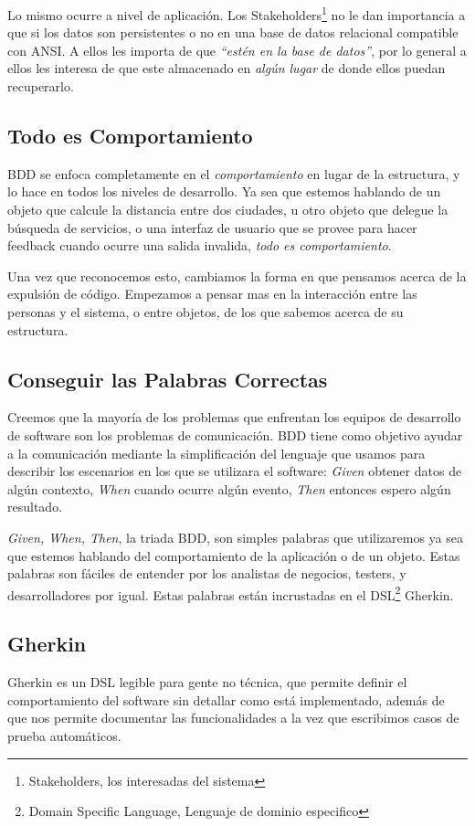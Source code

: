 Lo mismo ocurre a nivel de aplicación. Los Stakeholders\footnote{Stakeholders,
los interesadas del sistema} no le dan importancia a que si los datos son
persistentes o no en una base de datos relacional compatible con ANSI. A ellos
les importa de que {\it ``estén en la base de datos''}, por lo general a ellos
les interesa de que este almacenado en {\it algún lugar} de donde ellos puedan
recuperarlo.

\subsection{Todo es Comportamiento}
BDD se enfoca completamente en el {\it comportamiento} en lugar de la estructura,
y lo hace en todos los niveles de desarrollo. Ya sea que estemos hablando de un
objeto que calcule la distancia entre dos ciudades, u otro objeto que delegue la
búsqueda de servicios, o una interfaz de usuario que se provee para hacer feedback
cuando ocurre una salida invalida, {\it todo es comportamiento}.

Una vez que reconocemos esto, cambiamos la forma en que pensamos acerca de la
expulsión de código. Empezamos a pensar mas en la interacción entre las personas
y el sistema, o entre objetos, de los que sabemos acerca de su estructura.

\subsection{Conseguir las Palabras Correctas}
Creemos que la mayoría de los problemas que enfrentan los equipos de desarrollo
de software son los problemas de comunicación. BDD tiene como objetivo ayudar a la
comunicación mediante la simplificación del lenguaje que usamos para describir los
escenarios en los que se utilizara el software: {\it Given} obtener datos de algún
contexto, {\it When} cuando ocurre algún evento, {\it Then} entonces espero algún
resultado.

{\it Given, When, Then}, la triada BDD, son simples palabras que utilizaremos ya
sea que estemos hablando del comportamiento de la aplicación o de un objeto. Estas
palabras son fáciles de entender por los analistas de negocios, testers, y
desarrolladores por igual. Estas palabras están incrustadas en el DSL\footnote{
Domain Specific Language, Lenguaje de dominio especifico} Gherkin.

\subsection{Gherkin}
Gherkin es un DSL legible para gente no técnica, que permite definir el
comportamiento del software sin detallar como está implementado, además de que
nos permite documentar las funcionalidades a la vez que escribimos casos de
prueba automáticos.

